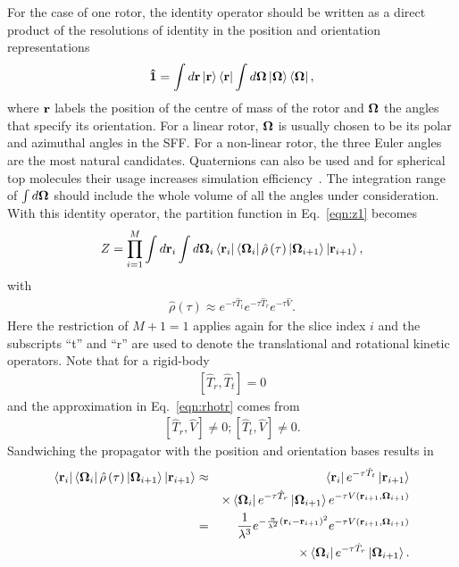 \documentclass[12pt]{iopart}
\begin{document}
For the case of one rotor, the identity operator should be written as a direct product of the resolutions of identity in the position and orientation representations
\begin{eqnarray}
{\bf \hat{1}}=\int d {\bf r} \left|{\bf r} \right>\left<{\bf r} \right| \int d{\bf \Omega}\left|{\bf \Omega}\right>\left<{\bf \Omega}\right|,
\end{eqnarray}
where ${\bf r}$ labels the position of the centre of mass of the rotor and ${\bf \Omega}$ the angles that specify its orientation. For a linear rotor, ${\bf \Omega}$ is usually chosen to be its polar and azimuthal angles in the SFF. For a non-linear rotor, the three Euler angles~\cite{zare_1988} are the most natural candidates. Quaternions can also be used and for spherical top molecules their usage increases simulation efficiency~\cite{mak_ch4_he}. The integration range of $\int d{\bf \Omega}$ should include the whole volume of all the angles under consideration. With this identity operator, the partition function in Eq.~\ref{eqn:z1} becomes
\begin{eqnarray}
Z=\prod_{i=1}^{M}\int d{\bf r}_i \int d{\bf \Omega}_i \left< {\bf r}_i \right|\left<{\bf \Omega}_i \right|\hat{\rho}\left(\tau\right)\left| {\bf \Omega}_{i+1} \right>\left| {\bf r}_{i+1} \right>,
\end{eqnarray}
with
\begin{eqnarray}
\hat{\rho}\left(\tau \right)\approx e^{ -\tau\hat{T}_t } e^{ -\tau\hat{T}_r } e^{ -\tau\hat{V} }. \label{eqn:rhotr}
\end{eqnarray}
Here the restriction of $M+1=1$ applies again for the slice index $i$ and the subscripts ``t'' and ``r'' are used to denote the translational and rotational kinetic operators. Note that for a rigid-body
\begin{eqnarray}
\left[\hat{T}_r , \hat{T}_t \right]=0
\end{eqnarray}
and the approximation in Eq.~\ref{eqn:rhotr} comes from
\begin{eqnarray}
\left[\hat{T}_r , \hat{V} \right]\ne0;\left[\hat{T}_t , \hat{V} \right]\ne0.
\end{eqnarray}
Sandwiching the propagator with the position and orientation bases results in
\begin{eqnarray}
\left< {\bf r}_i \right|\left<{\bf \Omega}_i \right|\hat{\rho}\left(\tau\right)\left| {\bf \Omega}_{i+1} \right>\left| {\bf r}_{i+1} \right>&\approx&\left<{\bf r}_i\right| e^{ -\tau\hat{T}_t }\left| {\bf r}_{i+1} \right>\nonumber\\
&&\times\left<{\bf \Omega}_i\right| e^{ -\tau\hat{T}_r }\left| {\bf \Omega}_{i+1} \right> e^{ -\tau V\left({\bf r}_{i+1}, {\bf \Omega}_{i+1} \right) } \nonumber\\
&=&\frac{1}{\lambda^3} e^{ -\frac{\pi}{\lambda^2}\left({\bf r}_i-{\bf r}_{i+1} \right)^2 } e^{-\tau V\left({\bf r}_{i+1}, {\bf \Omega}_{i+1} \right)}\nonumber\\
&&\times\left<{\bf \Omega}_i\right| e^{ -\tau\hat{T}_r }\left| {\bf \Omega}_{i+1} \right>. \label{eqn:link2}
\end{eqnarray}
\end{document}
